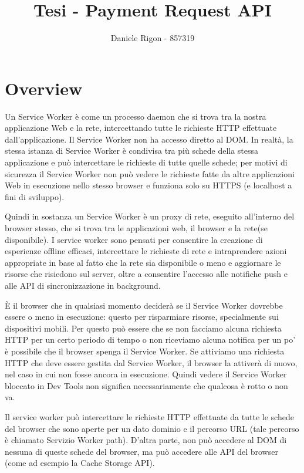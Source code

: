 \documentclass[italian]{article}
\author{
	Daniele Rigon - 857319 \\
}
\begin{document}
\title{Tesi - Payment Request API}
\maketitle

\tableofcontents
\pagebreak

\section{Overview}
Un Service Worker è come un processo daemon che si trova tra la nostra applicazione Web e la rete, intercettando tutte le richieste HTTP effettuate dall'applicazione. Il Service Worker non ha accesso diretto al DOM. In realtà, la stessa istanza di Service Worker è condivisa tra più schede della stessa applicazione e può intercettare le richieste di tutte quelle schede; per motivi di sicurezza il Service Worker non può vedere le richieste fatte da altre applicazioni Web in esecuzione nello stesso browser e funziona solo su HTTPS (e localhost a fini di sviluppo).

Quindi in sostanza un Service Worker è un proxy di rete, eseguito all'interno del browser stesso, che si trova tra le applicazioni web, il browser e la rete(se disponibile). I service worker sono pensati per consentire la creazione di esperienze offline efficaci, intercettare le richieste di rete e intraprendere azioni appropriate in base al fatto che la rete sia disponibile o meno e aggiornare le risorse che risiedono sul server, oltre a consentire l'accesso alle notifiche push e alle API di sincronizzazione in background.

È il browser che in qualsiasi momento deciderà se il Service Worker dovrebbe essere o meno in esecuzione: questo per risparmiare risorse, specialmente sui dispositivi mobili. Per questo può essere che se non facciamo alcuna richiesta HTTP per un certo periodo di tempo o non riceviamo alcuna notifica per un po' è possibile che il browser spenga il Service Worker. Se attiviamo una richiesta HTTP che deve essere gestita dal Service Worker, il browser la attiverà di nuovo, nel caso in cui non fosse ancora in esecuzione. Quindi vedere il Service Worker bloccato in Dev Tools non significa necessariamente che qualcosa è rotto o non va.

Il service worker può intercettare le richieste HTTP effettuate da tutte le schede del browser che sono aperte per un dato dominio e il percorso URL (tale percorso è chiamato Servizio Worker path). D'altra parte, non può accedere al DOM di nessuna di queste schede del browser, ma può accedere alle API del browser (come ad esempio la Cache Storage API).
\end{document}
